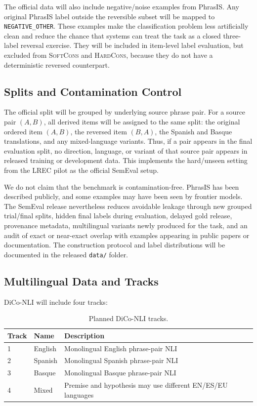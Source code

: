 \documentclass[11pt]{article}
\begin{document}
The official data will also include negative/noise examples from PhrasIS.
Any original PhrasIS label outside the reversible subset will be mapped to \texttt{NEGATIVE\_OTHER}.
These examples make the classification problem less artificially clean and reduce the chance that systems can treat the task as a closed three-label reversal exercise.
They will be included in item-level label evaluation, but excluded from \textsc{SoftCons} and \textsc{HardCons}, because they do not have a deterministic reversed counterpart.

\subsection{Splits and Contamination Control}

The official split will be grouped by underlying source phrase pair.
For a source pair \((A,B)\), all derived items will be assigned to the same split: the original ordered item \((A,B)\), the reversed item \((B,A)\), the Spanish and Basque translations, and any mixed-language variants.
Thus, if a pair appears in the final evaluation split, no direction, language, or variant of that source pair appears in released training or development data.
This implements the hard/unseen setting from the LREC pilot as the official SemEval setup.

We do not claim that the benchmark is contamination-free.
PhrasIS has been described publicly, and some examples may have been seen by frontier models.
The SemEval release nevertheless reduces avoidable leakage through new grouped trial/final splits, hidden final labels during evaluation, delayed gold release, provenance metadata, multilingual variants newly produced for the task, and an audit of exact or near-exact overlap with examples appearing in public papers or documentation.
The construction protocol and label distributions will be documented in the released \texttt{data/} folder.

\subsection{Multilingual Data and Tracks}

DiCo-NLI will include four tracks:

\begin{table}[h]
\centering
\small
\begin{tabular}{lll}
\toprule
Track & Name & Description \\
\midrule
1 & English & Monolingual English phrase-pair NLI \\
2 & Spanish & Monolingual Spanish phrase-pair NLI \\
3 & Basque & Monolingual Basque phrase-pair NLI \\
4 & Mixed & Premise and hypothesis may use different EN/ES/EU languages \\
\bottomrule
\end{tabular}
\caption{Planned DiCo-NLI tracks.}
\label{tab:tracks}
\end{table}
\end{document}
